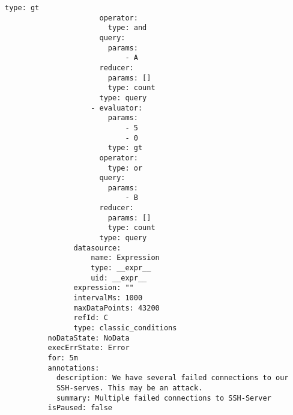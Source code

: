 {\begin{Verbatim}[frame=single,fontsize=\small]
                        type: gt
                      operator:
                        type: and
                      query:
                        params:
                            - A
                      reducer:
                        params: []
                        type: count
                      type: query
                    - evaluator:
                        params:
                            - 5
                            - 0
                        type: gt
                      operator:
                        type: or
                      query:
                        params:
                            - B
                      reducer:
                        params: []
                        type: count
                      type: query
                datasource:
                    name: Expression
                    type: __expr__
                    uid: __expr__
                expression: ""
                intervalMs: 1000
                maxDataPoints: 43200
                refId: C
                type: classic_conditions
          noDataState: NoData
          execErrState: Error
          for: 5m
          annotations:
            description: We have several failed connections to our 
            SSH-serves. This may be an attack.
            summary: Multiple failed connections to SSH-Server
          isPaused: false
  
\end{Verbatim}
}